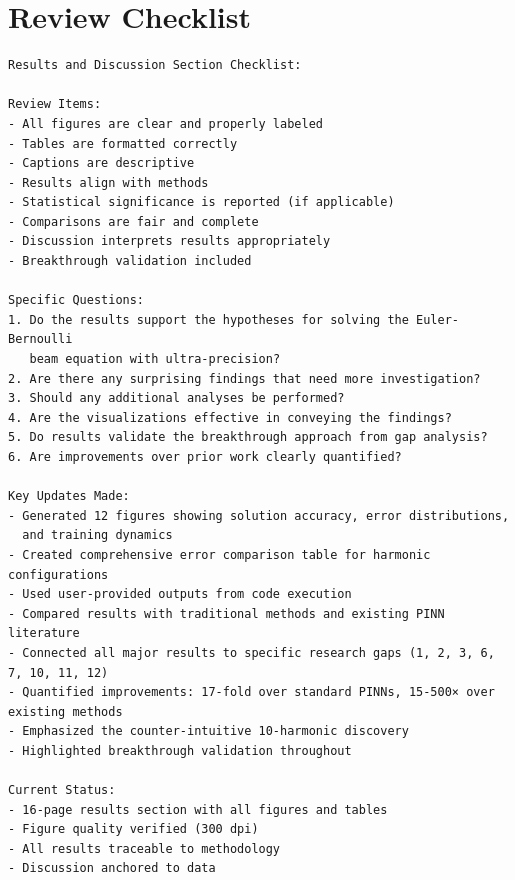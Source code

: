 \section*{Review Checklist}
\begin{small}
\begin{verbatim}
Results and Discussion Section Checklist:

Review Items:
- All figures are clear and properly labeled
- Tables are formatted correctly
- Captions are descriptive
- Results align with methods
- Statistical significance is reported (if applicable)
- Comparisons are fair and complete
- Discussion interprets results appropriately
- Breakthrough validation included

Specific Questions:
1. Do the results support the hypotheses for solving the Euler-Bernoulli 
   beam equation with ultra-precision?
2. Are there any surprising findings that need more investigation?
3. Should any additional analyses be performed?
4. Are the visualizations effective in conveying the findings?
5. Do results validate the breakthrough approach from gap analysis?
6. Are improvements over prior work clearly quantified?

Key Updates Made:
- Generated 12 figures showing solution accuracy, error distributions, 
  and training dynamics
- Created comprehensive error comparison table for harmonic configurations
- Used user-provided outputs from code execution
- Compared results with traditional methods and existing PINN literature
- Connected all major results to specific research gaps (1, 2, 3, 6, 7, 10, 11, 12)
- Quantified improvements: 17-fold over standard PINNs, 15-500× over existing methods
- Emphasized the counter-intuitive 10-harmonic discovery
- Highlighted breakthrough validation throughout

Current Status:
- 16-page results section with all figures and tables
- Figure quality verified (300 dpi)
- All results traceable to methodology
- Discussion anchored to data
\end{verbatim}
\end{small}
